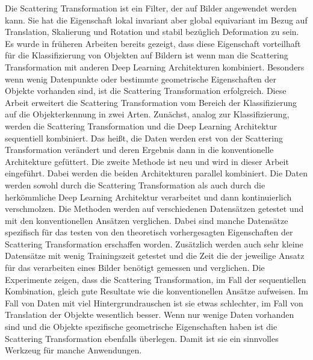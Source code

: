 Die Scattering Transformation ist ein Filter, der auf Bilder angewendet werden kann. Sie hat die Eigenschaft lokal invariant aber global equivariant im Bezug auf Translation, Skalierung und Rotation und stabil bezüglich Deformation zu sein. Es wurde in früheren Arbeiten bereits gezeigt, dass diese Eigenschaft vorteilhaft für die Klassifizierung von Objekten auf Bildern ist wenn man die Scattering Transformation mit anderen Deep Learning Architekturen kombiniert. Besonders wenn wenig Datenpunkte oder bestimmte geometrische Eigenschaften der Objekte vorhanden sind, ist die Scattering Transformation erfolgreich. Diese Arbeit erweitert die Scattering Transformation vom Bereich der Klassifizierung auf die Objekterkennung in zwei Arten. Zunächst, analog zur Klassifizierung, werden die Scattering Transformation und die Deep Learning Architektur sequentiell kombiniert. Das heißt, die Daten werden erst von der Scattering Transformation verändert und deren Ergebnis dann in die konventionelle Architekture gefüttert. Die zweite Methode ist neu und wird in dieser Arbeit eingeführt. Dabei werden die beiden Architekturen parallel kombiniert. Die Daten werden sowohl durch die Scattering Transformation als auch durch die herkömmliche Deep Learning Architektur verarbeitet und dann kontinuierlich verschmolzen. Die Methoden werden auf verschiedenen Datensätzen getestet und mit den konventionellen Ansätzen verglichen. Dabei sind manche Datensätze spezifisch für das testen von den theoretisch vorhergesagten Eigenschaften der Scattering Transformation erschaffen worden. Zusätzlich werden auch sehr kleine Datensätze mit wenig Trainingszeit getestet und die Zeit die der jeweilige Ansatz für das verarbeiten eines Bilder benötigt gemessen und verglichen. Die Experimente zeigen, dass die Scattering Transformation, im Fall der sequentiellen Kombination, gleich gute Resultate wie die konventionellen Ansätze aufweisen. Im Fall von Daten mit viel Hintergrundrauschen ist sie etwas schlechter, im Fall von Translation der Objekte wesentlich besser. Wenn nur wenige Daten vorhanden sind und die Objekte spezifische geometrische Eigenschaften haben ist die Scattering Transformation ebenfalls überlegen. Damit ist sie ein sinnvolles Werkzeug für manche Anwendungen. 